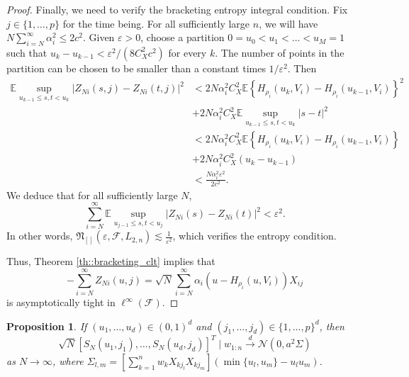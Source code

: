 \documentclass[11pt,a4paper]{article}
\newtheorem{prop}{Proposition}
\newcommand{\E}{\mathbb{E}}
\begin{document}
\begin{appendices}
\begin{proof}
Finally, we need to verify the bracketing entropy integral condition. Fix $j \in \{1,\ldots, p\}$ for the time being. For all sufficiently large $n$, we will have $N \sum_{i=N}^{\infty} \alpha_{i}^{2} \leq 2c^{2}$. Given $\varepsilon > 0$, choose a partition $0 = u_{0} < u_{1} < \ldots < u_{M} = 1$ such that $u_{k} - u_{k-1} < \varepsilon^{2}/(8C_{X}^{2}c^{2})$ for every $k$. The number of points in the partition can be chosen to be smaller than a constant times $1/\varepsilon^{2}$. Then
\begin{align*}
    \E \sup_{u_{k-1} \leq s,t < u_{k}} |Z_{Ni}(s,j) - Z_{Ni}(t,j)|^{2} &< 2N\alpha^{2}_{i}C_{X}^{2}\E\left\{H_{\rho_{i}}(u_{k},V_{i})-H_{\rho_{i}}(u_{k-1},V_{i})\right\}^{2}\\
    &+ 2N\alpha^{2}_{i}C_{X}^{2}\E \sup_{u_{k-1} \leq s,t < u_{k}} |s-t|^{2} \\
    &< 2N\alpha^{2}_{i}C_{X}^{2} \E\left\{H_{\rho_{i}}(u_{k},V_{i})-H_{\rho_{i}}(u_{k-1},V_{i})\right\}\\
    &+ 2N\alpha^{2}_{i}C_{X}^{2}(u_{k} - u_{k-1}) \\
    &< \frac{N \alpha_{i}^{2}\varepsilon^{2}}{2c^{2}}.
\end{align*}
We deduce that for all sufficiently large $N$,
\begin{equation*}
    \sum_{i=N}^{\infty}\E \sup_{u_{j-1} \leq s,t < u_{j}} |Z_{Ni}(s) - Z_{Ni}(t)|^{2} < \varepsilon^{2}.
\end{equation*}
In other words, $\mathfrak{N}_{[]}(\varepsilon, \mathcal{F}, L_{2,n}) \lesssim \frac{1}{\varepsilon^{2}}$, which verifies the entropy condition. 

Thus, {Theorem \ref{th::bracketing_clt}} implies that
\begin{equation*}
    -\sum_{i=N}^{\infty} Z_{Ni}(u,j) = \sqrt{N}\sum_{i=N}^{\infty}\alpha_{i}(u - H_{\rho_{i}}(u,V_{i}))X_{ij}
\end{equation*}
is asymptotically tight in $\ell^{\infty}(\mathcal{F})$.
\end{proof}

\begin{prop}
    If $(u_{1},\ldots,u_{d}) \in (0,1)^{d}$ and $(j_{1},\ldots, j_{d}) \in \{1,\ldots,p\}^{d}$, then
    \begin{equation*}
        \sqrt{N}[S_{N}(u_{1},j_{1}), \ldots, S_{N}(u_{d},j_{d})]^{T} \mid w_{1:n}\xrightarrow[]{d} \mathcal{N}(0,a^{2}\Sigma)
    \end{equation*}
    as $N \rightarrow \infty$, where $    \Sigma_{l,m} = \left[\sum_{k=1}^{n}w_{k}X_{kj_l}X_{kj_m}\right](\min\{u_l,u_m\} - u_l u_m)$.
\end{prop}


\end{appendices}
\end{document}
